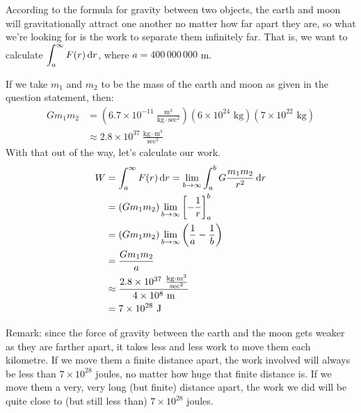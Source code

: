 \begin{solution}

According to the formula for gravity between two objects, the earth and moon will gravitationally attract one another no matter how far apart they are, so what we're looking for is the work to separate them infinitely far. That is, we want to calculate
$\displaystyle\int_a^\infty F(r)\,\mathrm{d}r$, where $a = 400\,000\,000$ m.

If we take $m_1$ and $m_2$ to be the mass of the earth and moon as given in the question statement, then:
\begin{align*}Gm_1m_2 &= \left(6.7\times 10^{-11} \ \frac{\text{m}^3}{\text{kg}\cdot\text{sec}^2}\right)
\left(6 \times 10^{24}\text{ kg}\right)\left(7 \times 10^{22}\text{ kg}\right)\\
&\approx 2.8 \times 10^{37} ~\frac{\text{kg}\cdot\text{m}^3}{\text{sec}^2}
\end{align*}
With that out of the way, let's calculate our work.
\begin{align*}
W&=\int_a^\infty F(r)\,\mathrm{d}r =\lim_{b \to \infty} \int_a^b  G\dfrac{m_1m_2}{r^2}\,\mathrm{d}r \\&=
(Gm_1m_2)\lim_{b \to \infty}\left[-\frac{1}{r}\right]_a^b \\
&=(Gm_1m_2)\lim_{b \to \infty} \left(\frac{1}{a}-\frac{1}{b}\right)\\&=
\frac{Gm_1m_2}{a}\\
&\approx\frac{2.8 \times 10^{37} ~\frac{\text{kg}\cdot\text{m}^3}{\text{sec}^2}}{4\times 10^8 \text{ m}}\\
&=7 \times 10^{28} \text{ J}
\end{align*}

Remark: since the force of gravity between the earth and the moon gets weaker as they are farther apart, it takes less and less work to move them each kilometre. If we move them a finite distance apart, the work involved will always be less than $7\times 10^{28}$ joules, no matter how huge that finite distance is. If we move them a very, very long (but finite) distance apart, the work we did will be quite close to (but still less than) $7\times 10^{28}$ joules.
\end{solution}

